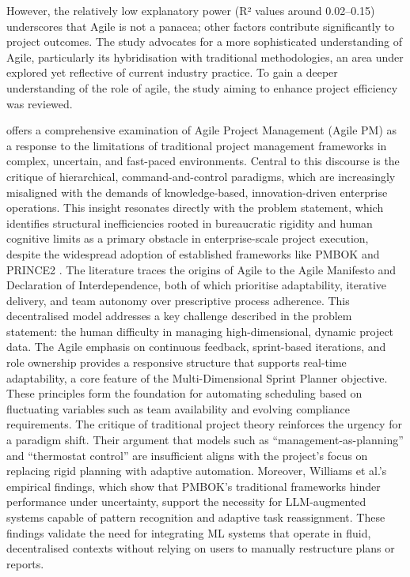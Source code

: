 \documentclass{report}
\begin{document}
However, the relatively low explanatory power (R² values around 0.02–0.15) underscores that Agile is not a panacea; other factors contribute significantly to project outcomes. The study advocates for a more sophisticated understanding of Agile, particularly its hybridisation with traditional methodologies, an area under explored yet reflective of current industry practice.
To gain a deeper understanding of the role of agile, the study aiming to enhance project efficiency was reviewed. \author{priscaamajuoyiOptimizingAgileProject2024} offers a comprehensive examination of Agile Project Management (Agile PM) as a response to the limitations of traditional project management frameworks in complex, uncertain, and fast-paced environments. Central to this discourse is the critique of hierarchical, command-and-control paradigms, which are increasingly misaligned with the demands of knowledge-based, innovation-driven enterprise operations. This insight resonates directly with the problem statement, which identifies structural inefficiencies rooted in bureaucratic rigidity and human cognitive limits as a primary obstacle in enterprise-scale project execution, despite the widespread adoption of established frameworks like PMBOK and PRINCE2 \parencite{pricaEnhancingProjectEfficiency2025}.
The literature traces the origins of Agile to the Agile Manifesto and Declaration of Interdependence, both of which prioritise adaptability, iterative delivery, and team autonomy over prescriptive process adherence. This decentralised model addresses a key challenge described in the problem statement: the human difficulty in managing high-dimensional, dynamic project data. The Agile emphasis on continuous feedback, sprint-based iterations, and role ownership provides a responsive structure that supports real-time adaptability, a core feature of the Multi-Dimensional Sprint Planner objective. These principles form the foundation for automating scheduling based on fluctuating variables such as team availability and evolving compliance requirements.
The critique of traditional project theory reinforces the urgency for a paradigm shift. Their argument that models such as “management-as-planning” and “thermostat control” are insufficient aligns with the project's focus on replacing rigid planning with adaptive automation. Moreover, Williams et al.’s empirical findings, which show that PMBOK’s traditional frameworks hinder performance under uncertainty, support the necessity for LLM-augmented systems capable of pattern recognition and adaptive task reassignment. These findings validate the need for integrating ML systems that operate in fluid, decentralised contexts without relying on users to manually restructure plans or reports.
\end{document}
